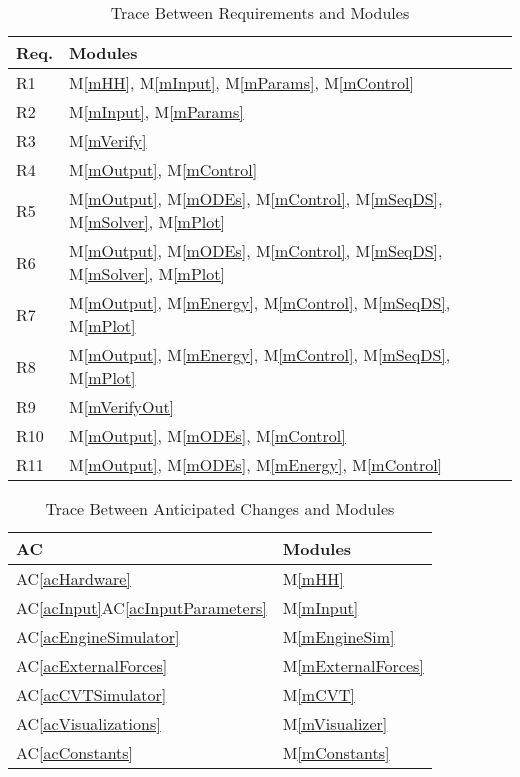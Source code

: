 \documentclass[12pt, titlepage]{article}
\newcommand{\acref}[1]{AC\ref{#1}}
\newcommand{\mref}[1]{M\ref{#1}}
\begin{document}
\begin{table}[H]
\centering
\begin{tabular}{p{} p{}}
\toprule
\textbf{Req.} & \textbf{Modules}\\
\midrule
R1 & \mref{mHH}, \mref{mInput}, \mref{mParams}, \mref{mControl}\\
R2 & \mref{mInput}, \mref{mParams}\\
R3 & \mref{mVerify}\\
R4 & \mref{mOutput}, \mref{mControl}\\
R5 & \mref{mOutput}, \mref{mODEs}, \mref{mControl}, \mref{mSeqDS}, \mref{mSolver}, \mref{mPlot}\\
R6 & \mref{mOutput}, \mref{mODEs}, \mref{mControl}, \mref{mSeqDS}, \mref{mSolver}, \mref{mPlot}\\
R7 & \mref{mOutput}, \mref{mEnergy}, \mref{mControl}, \mref{mSeqDS}, \mref{mPlot}\\
R8 & \mref{mOutput}, \mref{mEnergy}, \mref{mControl}, \mref{mSeqDS}, \mref{mPlot}\\
R9 & \mref{mVerifyOut}\\
R10 & \mref{mOutput}, \mref{mODEs}, \mref{mControl}\\
R11 & \mref{mOutput}, \mref{mODEs}, \mref{mEnergy}, \mref{mControl}\\
\bottomrule
\end{tabular}
\caption{Trace Between Requirements and Modules}
\label{TblRT}
\end{table}

\begin{table}[H]
\centering
\begin{tabular}{p{} p{}}
\toprule
\textbf{AC} & \textbf{Modules}\\
\midrule
\acref{acHardware} & \mref{mHH}\\
\acref{acInput}\acref{acInputParameters} & \mref{mInput}\\
\acref{acEngineSimulator} & \mref{mEngineSim}\\
\acref{acExternalForces} & \mref{mExternalForces}\\
\acref{acCVTSimulator} & \mref{mCVT}\\
\acref{acVisualizations} & \mref{mVisualizer}\\
\acref{acConstants} & \mref{mConstants}\\

\bottomrule
\end{tabular}
\caption{Trace Between Anticipated Changes and Modules}
\label{TblACT}
\end{table}
\end{document}
